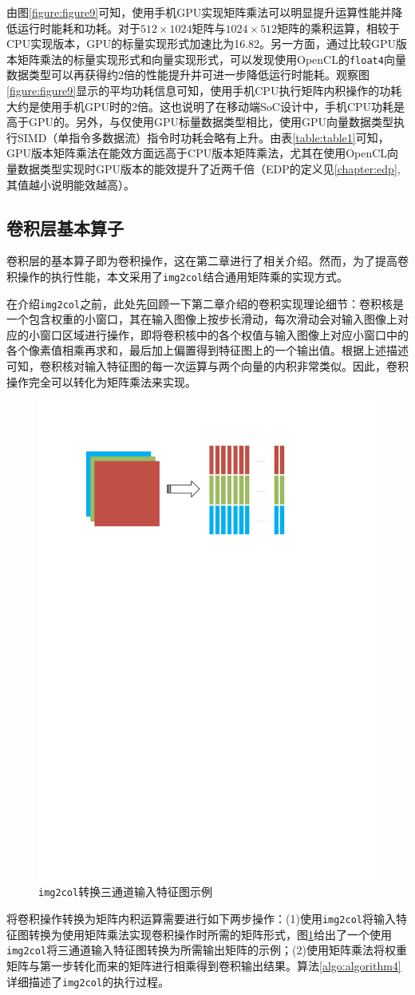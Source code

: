 由图\ref{figure:figure9}可知，使用手机GPU实现矩阵乘法可以明显提升运算性能并降低运行时能耗和功耗。对于$512\times1024$矩阵与$1024\times512$矩阵的乘积运算，相较于CPU实现版本，GPU的标量实现形式加速比为16.82。另一方面，通过比较GPU版本矩阵乘法的标量实现形式和向量实现形式，可以发现使用OpenCL的\texttt{float4}向量数据类型可以再获得约2倍的性能提升并可进一步降低运行时能耗。观察图\ref{figure:figure9}显示的平均功耗信息可知，使用手机CPU执行矩阵内积操作的功耗大约是使用手机GPU时的2倍。这也说明了在移动端SoC设计中，手机CPU功耗是高于GPU的。另外，与仅使用GPU标量数据类型相比，使用GPU向量数据类型执行SIMD（单指令多数据流）指令时功耗会略有上升。由表\ref{table:table1}可知，GPU版本矩阵乘法在能效方面远高于CPU版本矩阵乘法，尤其在使用OpenCL向量数据类型实现时GPU版本的能效提升了近两千倍（EDP的定义见\ref{chapter:edp},其值越小说明能效越高）。

\subsection{卷积层基本算子}

卷积层的基本算子即为卷积操作，这在第二章进行了相关介绍。然而，为了提高卷积操作的执行性能，本文采用了\texttt{img2col}结合通用矩阵乘的实现方式。

在介绍\texttt{img2col}之前，此处先回顾一下第二章介绍的卷积实现理论细节：卷积核是一个包含权重的小窗口，其在输入图像上按步长滑动，每次滑动会对输入图像上对应的小窗口区域进行操作，即将卷积核中的各个权值与输入图像上对应小窗口中的各个像素值相乘再求和，最后加上偏置得到特征图上的一个输出值。根据上述描述可知，卷积核对输入特征图的每一次运算与两个向量的内积非常类似。因此，卷积操作完全可以转化为矩阵乘法来实现。

\begin{figure}[htb]
    \begin{center}
    \includegraphics[height=0.25\textwidth]{figures/im2col.pdf}
    \end{center}
    \caption{\texttt{img2col}转换三通道输入特征图示例}\label{figure:figure10}
\end{figure}

将卷积操作转换为矩阵内积运算需要进行如下两步操作：(1)使用\texttt{img2col}将输入特征图转换为使用矩阵乘法实现卷积操作时所需的矩阵形式，图\ref{figure:figure10}给出了一个使用\texttt{img2col}将三通道输入特征图转换为所需输出矩阵的示例；(2)使用矩阵乘法将权重矩阵与第一步转化而来的矩阵进行相乘得到卷积输出结果。算法\ref{algo:algorithm4}详细描述了\texttt{img2col}的执行过程。


